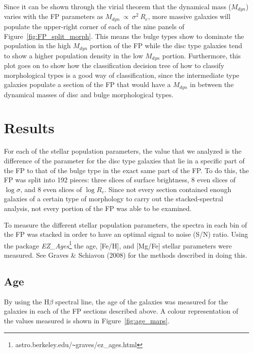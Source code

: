 \documentclass[showcase, preprintnumbers, amsmath, amssymb, bibnotes, 12pt]{revtex4}
\begin{document}
Since it can be shown through the virial theorem that the dynamical mass ($M_{dyn}$) varies with the FP parameters as $M_{dyn}~\propto~\sigma^2~R_e$, more massive galaxies will populate the upper-right corner of each of the nine panels of Figure~\ref{fig:FP_split_morph}. This means the bulge types show to dominate the population in the high $M_{dyn}$ portion of the FP while the disc type galaxies tend to show a higher population density in the low $M_{dyn}$ portion. Furthermore, this plot goes on to show how the classification decision tree of how to classify morphological types is a good way of classification, since the intermediate type galaxies populate a section of the FP that would have a $M_{dyn}$ in between the dynamical masses of disc and bulge morphological types. 


\section{Results}


For each of the stellar population parameters, the value that we analyzed is the difference of the parameter for the disc type galaxies that lie in a specific part of the FP to that of the bulge type in the exact same part of the FP. To do this, the FP was split into 192 pieces: three slices of surface brightness, 8 even slices of $\log{\sigma}$, and 8 even slices of $\log{R_e}$. Since not every section contained enough galaxies of a certain type of morphology to carry out the stacked-spectral analysis, not every portion of the FP was able to be examined.

To measure the different stellar population parameters, the spectra in each bin of the FP was stacked in order to have an optimal signal to noise (S/N) ratio. Using the package \emph{EZ\_Ages}\footnote{astro.berkeley.edu/\texttt{\~}graves/ez\_ages.html} the age, [Fe/H], and [Mg/Fe] stellar parameters were measured. See Graves \& Schiavon (2008) for the methods described in doing this.

\subsection{Age}

By using the H$\beta$ spectral line, the age of the galaxies was measured for the galaxies in each of the FP sections described above. A colour representation of the values measured is shown in Figure~\ref{fig:age_maps}. 
\end{document}
